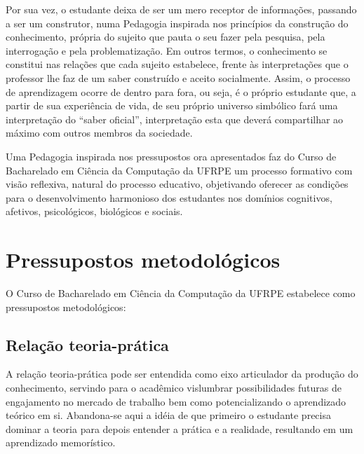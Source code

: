 \documentclass[
	12pt,				%
	openright,			%
  oneside,     %
	a4paper,			%
	english,			%
	french,				%
	spanish,			%
	brazil				%
	]{abntex2}
\begin{document}
Por sua vez, o estudante deixa de ser um mero receptor de informações, passando
a ser um construtor, numa Pedagogia inspirada nos princípios da construção do
conhecimento, própria do sujeito que pauta o seu fazer pela pesquisa, pela
interrogação e pela problematização. Em outros termos, o conhecimento se
constitui nas relações que cada sujeito estabelece, frente às interpretações que
o professor lhe faz de um saber construído e aceito socialmente. Assim, o
processo de aprendizagem ocorre de dentro para fora, ou seja, é o próprio
estudante que, a partir de sua experiência de vida, de seu próprio universo
simbólico fará uma interpretação do ``saber oficial'', interpretação esta que
deverá compartilhar ao máximo com outros membros da sociedade.

Uma Pedagogia inspirada nos pressupostos ora apresentados faz do Curso de
Bacharelado em Ciência da Computação da UFRPE um processo formativo com visão
reflexiva, natural do processo educativo, objetivando oferecer as condições para
o desenvolvimento harmonioso dos estudantes nos domínios cognitivos, afetivos,
psicológicos, biológicos e sociais.




%
%




\chapter{Pressupostos metodológicos}

O Curso de Bacharelado em Ciência da Computação da UFRPE estabelece como
pressupostos metodológicos: 

\section{Relação teoria-prática}

A relação teoria-prática pode ser entendida como eixo articulador da produção do
conhecimento, servindo para o acadêmico vislumbrar possibilidades futuras de engajamento no mercado de
trabalho bem como potencializando o aprendizado teórico em si. Abandona-se aqui
a idéia de que primeiro o estudante precisa dominar a teoria para depois
entender a prática e a realidade, resultando em um aprendizado memorístico.
\end{document}
